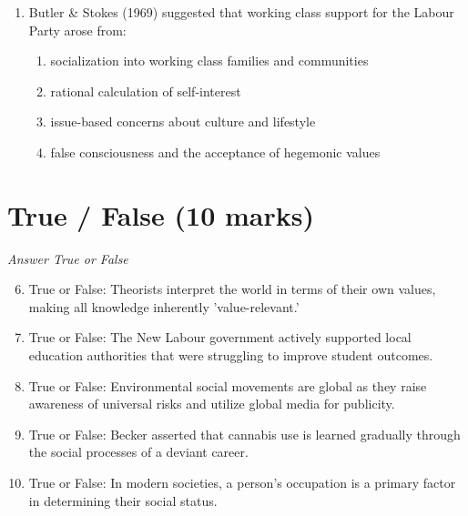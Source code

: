 \documentclass[12pt]{article}
\begin{document}
\begin{enumerate}[label=\arabic*.]
\begin{enumerate}[label=(\alph*)]
    \item they are in pursuit of the 'perfect' body, fuelled by images of beauty
    \item they perceive a part of their body as stigmatizing, in relation to a cultural ideal
    \item their male partners pressurize them to look like supermodels
\end{enumerate}
\item Butler \& Stokes (1969) suggested that working class support for the Labour Party arose from:
\begin{enumerate}[label=(\alph*)]
    \item socialization into working class families and communities
    \item rational calculation of self-interest
    \item issue-based concerns about culture and lifestyle
    \item false consciousness and the acceptance of hegemonic values
\end{enumerate}
\end{enumerate}

\section*{True / False (10 marks)}
\textit{Answer True or False}
\begin{enumerate}[label=\arabic*.]
\setcounter{enumi}{5}
\item True or False: Theorists interpret the world in terms of their own values, making all knowledge inherently 'value-relevant.'
\item True or False: The New Labour government actively supported local education authorities that were struggling to improve student outcomes.
\item True or False: Environmental social movements are global as they raise awareness of universal risks and utilize global media for publicity.
\item True or False: Becker asserted that cannabis use is learned gradually through the social processes of a deviant career.
\item True or False: In modern societies, a person's occupation is a primary factor in determining their social status.
\end{enumerate}
\end{document}
